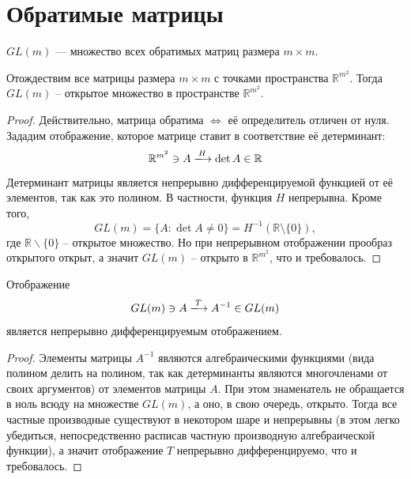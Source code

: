 \documentclass[11pt]{article}
\begin{document}
\section{Обратимые матрицы}

\begin{definition}
    $GL(m)$ --- множество всех обратимых матриц размера $m \times m$.
\end{definition}

\begin{remark}
    Отождествим все матрицы размера $m \times m$ с точками пространства $\mathbb{R}^{m^2}$. 
    Тогда $GL(m)$ -- открытое множество в пространстве $\mathbb{R}^{m^2}$.
\end{remark}

\begin{proof}
    Действительно, матрица обратима $\Longleftrightarrow$ её определитель отличен от нуля. \\
    Зададим отображение, которое матрице ставит в соответствие её детерминант: 
    \[\mathbb{R}^{m^2} \ni A \xlongrightarrow{H} \det A \in \mathbb{R}\] 
    Детерминант матрицы является непрерывно дифференцируемой функцией от её элементов, так как это полином. 
    В частности, функция $H$ непрерывна. Кроме того, 
    \[GL(m) = \{A: \det A \neq 0\} = H^{-1}(\mathbb{R} \setminus \{0\}),\]
    где $\mathbb{R} \backslash \{0\}$ -- открытое множество. Но при непрерывном отображении прообраз открытого открыт, а значит $GL(m)$ -- открыто в $\mathbb{R}^{m^2}$, что и требовалось.
\end{proof}

\begin{lemma} \label{lemma:2.1}
    Отображение \[GL(m) \ni A \xlongrightarrow{T} A^{-1} \in GL(m)\] 
    является непрерывно дифференцируемым отображением.
\end{lemma}

\begin{proof}
    Элементы матрицы $A^{-1}$ являются алгебраическими функциями (вида полином делить на полином, так как детерминанты являются многочленами от своих аргументов) 
    от элементов матрицы $A$. При этом знаменатель не обращается в ноль всюду на множестве $GL(m)$, 
    а оно, в свою очередь, открыто. Тогда все частные производные существуют в некотором шаре и непрерывны (в этом легко убедиться, непосредственно расписав частную производную алгебраической функции), а значит отображение $T$ непрерывно дифференцируемо, что и требовалось. 
\end{proof}
\end{document}

